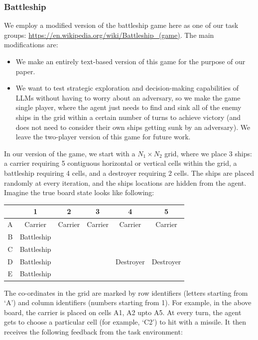 \documentclass{article}
\theoremstyle{plain}
\theoremstyle{definition}
\theoremstyle{remark}
\begin{document}
\subsubsection{Battleship}\label{appendix:battleship}
We employ a modified version of the battleship game here as one of our task groups: \url{https://en.wikipedia.org/wiki/Battleship_(game)}. The main modifications are:
\begin{itemize}
    \item We make an entirely text-based version of this game for the purpose of our paper.
    \item We want to test strategic exploration and decision-making capabilities of LLMs without having to worry about an adversary, so we make the game single player, where the agent just needs to find and sink all of the enemy ships in the grid within a certain number of turns to achieve victory (and does not need to consider their own ships getting sunk by an adversary). We leave the two-player version of this game for future work.
\end{itemize}
In our version of the game, we start with a $N_1 \times N_2$ grid, where we place 3 ships: a carrier requiring 5 contiguous horizontal or vertical cells within the grid, a battleship requiring 4 cells, and a destroyer requiring 2 cells. The ships are placed randomly at every iteration, and the ships locations are hidden from the agent. Imagine the true board state looks like following:
\begin{table}[h]
\centering
\begin{tabular}{|c|c|c|c|c|c|}
\hline
& 1 & 2 & 3 & 4 & 5 \\
\hline
A & Carrier & Carrier & Carrier & Carrier & Carrier \\
\hline
B & Battleship & & & & \\
\hline
C & Battleship & & & & \\
\hline
D & Battleship & & & Destroyer & Destroyer \\
\hline
E & Battleship & & & & \\
\hline
\end{tabular}
\end{table}
The co-ordinates in the grid are marked by row identifiers (letters starting from `A') and column identifiers (numbers starting from 1). For example, in the above board, the carrier is placed on cells A1, A2 upto A5. At every turn, the agent gets to choose a particular cell (for example, `C2') to hit with a missile. It then receives the following feedback from the task environment:
\end{document}
